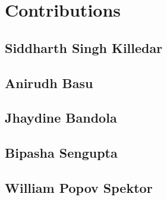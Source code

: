 \section{Contributions}

\subsection{Siddharth Singh Killedar}

\subsection{Anirudh Basu}

\subsection{Jhaydine Bandola}

\subsection{Bipasha Sengupta}

\subsection{William Popov Spektor}
